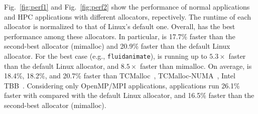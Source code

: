 Fig.~\ref{fig:perf1} and Fig.~\ref{fig:perf2} show the performance of normal applications and HPC applications with different allocators, repectively. The runtime of each allocator is normalized to that of Linux's default one. 
Overall, \NM{} has the best performance among these allocators. In particular, \NM{} is 17.7\% faster than the second-best allocator (mimalloc) and 20.9\% faster than the default Linux allocator. 
For the best case (e.g., \texttt{fluidanimate}), \NM{} is running up to $5.3\times$ faster than the default Linux allocator, and $8.5\times$ faster than mimalloc.
On average, \NM{} is 18.4\%, 18.2\%, and 20.7\% faster than TCMalloc~\cite{tcmalloc2}, TCMalloc-NUMA~\cite{tcmallocnuma}, Intel TBB~\cite{tbb3}. Considering only OpenMP/MPI applications, applications run 26.1\% faster with \NM{} compared with the default Linux allocator, and 16.5\% faster than the second-best allocator (mimalloc).

